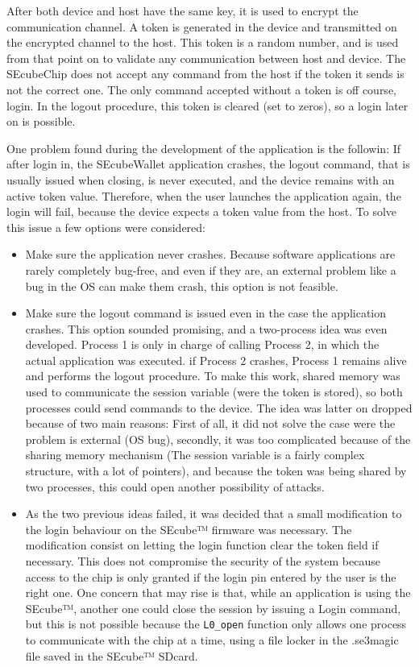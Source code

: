 After both device and host have the same key, it is used to encrypt the communication channel. A token is generated in the device and transmitted on the encrypted channel to the host. This token is a random number, and is used from that point on to validate any communication between host and device. The SEcubeChip does not accept any command from the host if the token it sends is not the correct one. The only command accepted without a token is off course, login. In the logout procedure, this token is cleared (set to zeros), so a login later on is possible.

One problem found during the development of the application is the followin: If after login in, the SEcubeWallet application crashes, the logout command, that is usually issued when closing, is never executed, and the device remains with an active token value. Therefore, when the user launches the application again, the login will fail, because the device expects a token value from the host. To solve this issue a few options were considered:

\begin{itemize}
\setlength\itemsep{-3pt}

\item Make sure the application never crashes. Because software applications are rarely completely bug-free, and even if they are, an external problem like a bug in the OS can make them crash, this option is not feasible. 
\item Make sure the logout command is issued even in the case the application crashes. This option sounded promising, and a two-process idea was even developed. Process 1 is only in charge of calling Process 2, in which the actual application was executed. if Process 2 crashes, Process 1 remains alive and performs the logout procedure. To make this work, shared memory was used to communicate the session variable (were the token is stored), so both processes could send commands to the device. The idea was latter on dropped because of two main reasons: First of all, it did not solve the case were the problem is external (OS bug), secondly, it was too complicated because of the sharing memory mechanism (The session variable is a fairly complex structure, with a lot of pointers), and because the token was being shared by two processes, this could open another possibility of attacks.
\item As the two previous ideas failed, it was decided that a small modification to the login behaviour on the SEcube™ firmware was necessary. The modification consist on letting the login function clear the token field if necessary. This does not compromise the security of the system because access to the chip is only granted if the login pin entered by the user is the right one. One concern that may rise is that, while an application is using the SEcube™, another one could close the session by issuing a Login command, but this is not possible because the \texttt{L0\_open} function only allows one process to communicate with the chip at a time, using a file locker in the .se3magic
file saved in the SEcube™ SDcard.
\end{itemize} 

